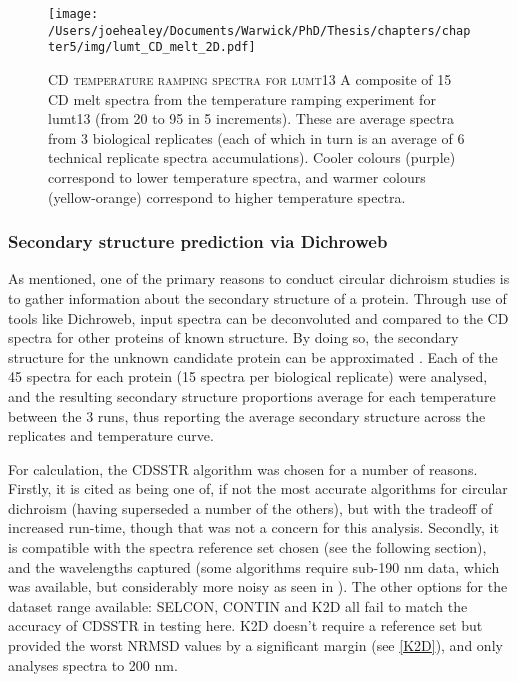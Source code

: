 \begin{figure}[p]
	\centering
	\texttt{[image: /Users/joehealey/Documents/Warwick/PhD/Thesis/chapters/chapter5/img/lumt\_CD\_melt\_2D.pdf]}
	\captionsetup{singlelinecheck=off, justification=justified, font=footnotesize, aboveskip=10pt}
	\caption[lumt13 CD melt plot]{\textsc{\normalsize CD temperature ramping spectra for lumt13}\vspace{0.1cm} \newline A composite of 15 CD melt spectra from the temperature ramping experiment for lumt13 (from 20\degC{} to 95\degC{} in 5\degC{} increments). These are average spectra from 3 biological replicates (each of which in turn is an average of 6 technical replicate spectra accumulations). Cooler colours (purple) correspond to lower temperature spectra, and warmer colours (yellow-orange) correspond to higher temperature spectra.}
	\label{lumtmelt}
\end{figure}

\subsubsection{Secondary structure prediction via Dichroweb}
As mentioned, one of the primary reasons to conduct circular dichroism studies is to gather information about the secondary structure of a protein. Through use of tools like Dichroweb, input spectra can be deconvoluted and compared to the CD spectra for other proteins of known structure. By doing so, the secondary structure for the unknown candidate protein can be approximated \citep{Whitmore2004, Lobley2002}. Each of the 45 spectra for each protein (15 spectra per biological replicate) were analysed, and the resulting secondary structure proportions average for each temperature between the 3 runs, thus reporting the average secondary structure across the replicates and temperature curve.

For calculation, the CDSSTR algorithm \citep{Compton1986,Sreerama2000b, Manavalan1987} was chosen for a number of reasons. Firstly, it is cited as being one of, if not the most accurate algorithms for circular dichroism (having superseded a number of the others), but with the tradeoff of increased run-time, though that was not a concern for this analysis. Secondly, it is compatible with the spectra reference set chosen (see the following section), and the wavelengths captured (some algorithms require sub-190 nm data, which was available, but considerably more noisy as seen in ). The other options for the dataset range available: SELCON, CONTIN and K2D all fail to match the accuracy of CDSSTR in testing here. K2D doesn't require a reference set but provided the worst NRMSD values by a significant margin (see \vref{K2D}), and only analyses spectra to 200 nm.

